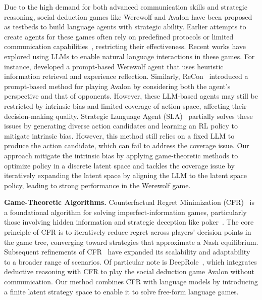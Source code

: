 Due to the high demand for both advanced communication skills and strategic reasoning, social deduction games like Werewolf and Avalon have been proposed as testbeds to build language agents with strategic ability. 
Earlier attempts to create agents for these games often rely on predefined protocols or limited communication capabilities~\cite{wang2018application}, restricting their effectiveness.
Recent works have explored using LLMs to enable natural language interactions in these games.
For instance, \citet{xu2023exploring} developed a prompt-based Werewolf agent that uses heuristic information retrieval and experience reflection.
Similarly, ReCon~\cite{wang2023avalon} introduced a prompt-based method for playing Avalon by considering both the agent's perspective and that of opponents.
However, these LLM-based agents may still be restricted by intrinsic bias and limited coverage of action space, affecting their decision-making quality.
Strategic Language Agent (SLA)~\cite{xu2023language} partially solves these issues by generating diverse action candidates and learning an RL policy to mitigate intrinsic bias. However, this method still relies on a fixed LLM to produce the action candidate, which can fail to address the coverage issue. Our approach mitigate the intrinsic bias by applying game-theoretic methods to optimize policy in a discrete latent space and tackles the coverage issue by iteratively expanding the latent space by aligning the LLM to the latent space policy, leading to strong performance in the Werewolf game.



\textbf{Game-Theoretic Algorithms.}
Counterfactual Regret Minimization (CFR)~\cite{zinkevich2007regret} is a foundational algorithm for solving imperfect-information games, particularly those involving hidden information and strategic deception like poker~\cite{moravvcik2017deepstack,brown2018superhuman,brown2019superhuman}. The core principle of CFR is to iteratively reduce regret across players’ decision points in the game tree, converging toward strategies that approximate a Nash equilibrium. Subsequent refinements of CFR~\cite{lanctot2009monte,tammelin2014solving,brown2019deep} have expanded its scalability and adaptability to a broader range of scenarios. Of particular note is DeepRole~\cite{serrino2019finding}, which integrates deductive reasoning with CFR to play the social deduction game Avalon without communication. Our method combines CFR with language models by introducing a finite latent strategy space to enable it to solve free-form language games.


